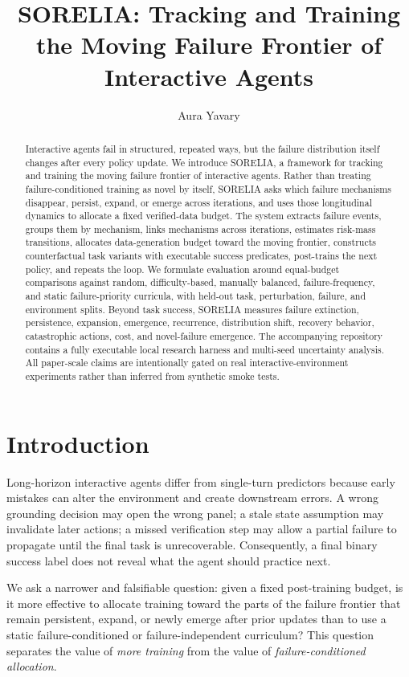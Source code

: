 \documentclass{article}
\title{SORELIA: Tracking and Training the Moving Failure Frontier of Interactive Agents}
\author{Aura Yavary}
\begin{document}
\maketitle

\begin{abstract}
Interactive agents fail in structured, repeated ways, but the failure distribution itself changes after every policy update. We introduce SORELIA, a framework for tracking and training the moving failure frontier of interactive agents. Rather than treating failure-conditioned training as novel by itself, SORELIA asks which failure mechanisms disappear, persist, expand, or emerge across iterations, and uses those longitudinal dynamics to allocate a fixed verified-data budget. The system extracts failure events, groups them by mechanism, links mechanisms across iterations, estimates risk-mass transitions, allocates data-generation budget toward the moving frontier, constructs counterfactual task variants with executable success predicates, post-trains the next policy, and repeats the loop. We formulate evaluation around equal-budget comparisons against random, difficulty-based, manually balanced, failure-frequency, and static failure-priority curricula, with held-out task, perturbation, failure, and environment splits. Beyond task success, SORELIA measures failure extinction, persistence, expansion, emergence, recurrence, distribution shift, recovery behavior, catastrophic actions, cost, and novel-failure emergence. The accompanying repository contains a fully executable local research harness and multi-seed uncertainty analysis. All paper-scale claims are intentionally gated on real interactive-environment experiments rather than inferred from synthetic smoke tests.
\end{abstract}

\section{Introduction}
Long-horizon interactive agents differ from single-turn predictors because early mistakes can alter the environment and create downstream errors. A wrong grounding decision may open the wrong panel; a stale state assumption may invalidate later actions; a missed verification step may allow a partial failure to propagate until the final task is unrecoverable. Consequently, a final binary success label does not reveal what the agent should practice next.

We ask a narrower and falsifiable question: given a fixed post-training budget, is it more effective to allocate training toward the parts of the failure frontier that remain persistent, expand, or newly emerge after prior updates than to use a static failure-conditioned or failure-independent curriculum? This question separates the value of \emph{more training} from the value of \emph{failure-conditioned allocation}.
\end{document}
